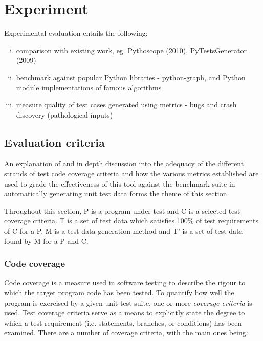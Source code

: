 \documentclass{icldt}
\numberwithin{equation}{section}       %
\begin{document}
{\section{Experiment}
Experimental evaluation entails the following:
\begin{enumerate}[i.]
	\item comparison with existing work, eg. Pythoscope (2010), PyTestsGenerator (2009)
	\item benchmark against popular Python libraries - python-graph, and Python module implementations of famous algorithms
	\item measure quality of test cases generated using metrics - bugs and crash discovery (pathological inputs)	
\end{enumerate}

\subsection{Evaluation criteria}
An explanation of and in depth discussion into the adequacy of the different strands of test code coverage criteria and how the various metrics established are used to grade the effectiveness of this tool against the benchmark suite in automatically generating unit test data forms the theme of this section.

Throughout this section, P is a program under test and C is a selected test coverage criteria. T is a set of test data which satisfies 100\% of test requirements of C for a P. M is a test data generation method and T' is a set of test data found by M for a P and C.

\subsubsection{Code coverage}
Code coverage is a measure used in software testing to describe the rigour to which the target program code has been tested. To quantify how well the program is exercised by a given unit test suite, one or more \emph{coverage criteria} is used. Test coverage criteria serve as a means to explicitly state the degree to which a test requirement (i.e. statements, branches, or conditions) has been examined. There are a number of coverage criteria, with the main ones being:

}
\end{document}
